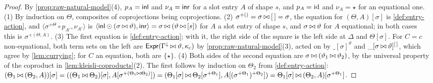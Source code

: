 \begin{proof}
    By \cref{prop:raw-natural-model}(4), $p_A = \mathsf{inl}$ and $\nu_A = \mathsf{inr}$ for a slot entry $A$ of shape $s$, and $p_A = \mathrm{id}$ and $\nu_A = \star$ for an equational one. (1) By induction on $\Theta$, composites of coprojections being coprojections. (2) $\sigma^{+()} = \sigma \mathbin{\bowtie} \left[\,\right] = \sigma$, the equation for $(\Theta, A)[\sigma]$ is \cref{def:entry-action}, and $\langle \sigma^{+\Theta} \circ p_{A'}, \nu_{A'} \rangle$ is $\langle \mathsf{inl} \odot (\sigma \mathbin{\bowtie} \vartheta), \mathsf{inr} \rangle = \sigma \mathbin{\bowtie} (\vartheta \mathbin{\bowtie} [s])$ for $A$ a slot entry of shape $s$, and $\sigma \mathbin{\bowtie} \vartheta$ for $A$ equational; in both cases this is $\sigma^{+(\Theta, A)}$. (3) The first equation is \cref{def:entry-action}; with it, the right side of the square is the left side at $\Delta$ and $\Theta[\sigma]$. For $C = c$ non-equational, both term sets on the left are $\mathsf{Expr}(\Gamma^{\downarrow} \mathbin{\bowtie} \vartheta, \kappa_c)$ by \cref{prop:raw-natural-model}(3), acted on by $\_[\sigma]^{\vartheta}$ and $\_[\sigma \mathbin{\bowtie} \vartheta]^{\left[\,\right]}$, which agree by \cref{lem:currying}; for $C$ an equation, both are $\{\star\}$. (4) Both sides of the second equation are $\sigma \mathbin{\bowtie} (\vartheta_1 \mathbin{\bowtie} \vartheta_2)$, by the universal property of the coproduct in \cref{lem:kleisli-coproducts}(2). The first follows by induction on $\Theta_2$ from \cref{def:entry-action}: $(\Theta_1 \mathbin{\bowtie} (\Theta_2, A))[\sigma] = ((\Theta_1 \mathbin{\bowtie} \Theta_2)[\sigma], A[\sigma^{+(\Theta_1 \mathbin{\bowtie} \Theta_2)}]) = (\Theta_1[\sigma] \mathbin{\bowtie} \Theta_2[\sigma^{+\Theta_1}], A[(\sigma^{+\Theta_1})^{+\Theta_2}]) = \Theta_1[\sigma] \mathbin{\bowtie} (\Theta_2, A)[\sigma^{+\Theta_1}]$.
\end{proof}


